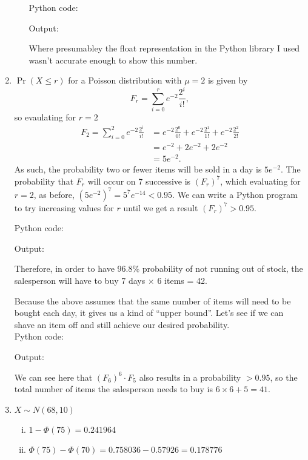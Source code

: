 \documentclass[10pt]{article}
\begin{document}
\begin{enumerate}
\begin{enumerate}[(i)]
                    Python code:
                    
                    Output:
                    
                    Where presumabley the float representation in the Python
                    library I used wasn't accurate enough to show this number.
            \end{enumerate}
        \item $\Pr(X \leq r)$ for a Poisson distribution with $\mu = 2$ is
            given by $$F_r = \sum_{i=0}^re^{-2}\frac{2^i}{i!},$$
            so evaulating for $r = 2$
                \begin{align*}
                    F_2 = \sum_{i=0}^2e^{-2}\frac{2^i}{i!} &= e^{-2}\frac{2^0}{0!} + e^{-2}\frac{2^1}{1!} + e^{-2}\frac{2^2}{2!} \\
                    &= e^{-2} + 2e^{-2} + 2e^{-2} \\
                    &= 5e^{-2}.
                \end{align*}
                As such, the probability two or fewer items will be sold in a
                day is $5e^{-2}$. The probability that $F_r$ will occur on 7
                successive is $(F_r)^7$, which evaluating for $r = 2$, as
                before, $\left(5e^{-2}\right)^7 = 5^7e^{-14} < 0.95$. We can
                write a Python program to try increasing values for $r$ until
                we get a result $(F_r)^7 > 0.95$.

                \pagebreak

                Python code:
                
                Output:
                

                Therefore, in order to have 96.8\% probability of not running
                out of stock, the salesperson will have to buy 7 days $\times$
                6 items = 42.

                Because the above assumes that the same number of items will
                need to be bought each day, it gives us a kind of ``upper
                bound''. Let's see if we can shave an item off and still
                achieve our desired probability.
                \\

                Python code:
                
                Output:
                

                We can see here that $(F_6)^6 \cdot F_5$ also results in a
                probability $> 0.95$, so the total number of items the
                salesperson needs to buy is $6 \times 6 + 5 = 41$.
            \item  $X \sim N(68, 10)$
            \begin{enumerate}[(i)]
                \item $1 - \Phi(75) = 0.241964$
                \item $\Phi(75) - \Phi(70) = 0.758036 - 0.57926 = 0.178776$
            \end{enumerate}
    \end{enumerate}
\end{document}
